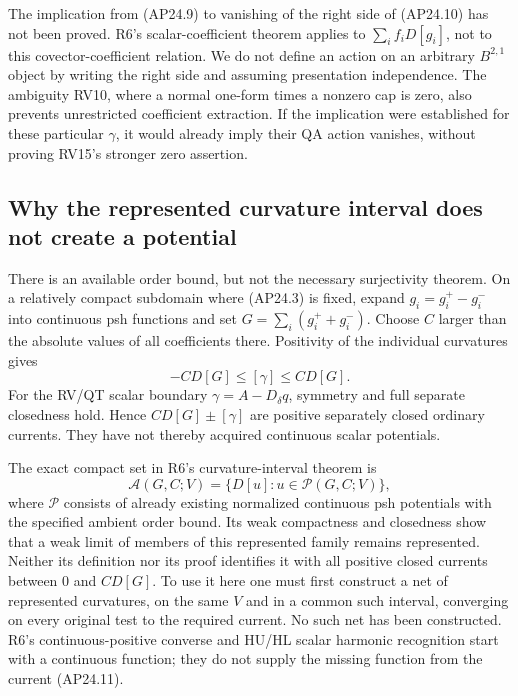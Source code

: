 The implication from (AP24.9) to vanishing of the right side of
(AP24.10) has not been proved.  R6's scalar-coefficient theorem
applies to \(\sum_i f_iD[g_i]\), not to this covector-coefficient
relation.  We do not define an action on an arbitrary
\(B^{2,1}\) object by writing the right side and assuming
presentation independence.  The ambiguity RV10, where a normal
one-form times a nonzero cap is zero, also prevents unrestricted
coefficient extraction.  If the implication were established for
these particular \(\gamma\), it would already imply their QA
action vanishes, without proving RV15's stronger zero assertion.

\subsection{Why the represented curvature interval does not create a potential}

There is an available order bound, but not the necessary
surjectivity theorem.  On a relatively compact subdomain where
(AP24.3) is fixed, expand \(g_i=g_i^+-g_i^-\) into continuous
psh functions and set \(G=\sum_i(g_i^++g_i^-)\).
Choose \(C\) larger than the absolute values of all coefficients
there.  Positivity of the individual curvatures gives
\[
                       -C D[G]\le[\gamma]\le C D[G].      \tag{AP24.11}
\]
For the RV/QT scalar boundary \(\gamma=A-D_\delta q\), symmetry
and full separate closedness hold.  Hence
\(CD[G]\pm[\gamma]\) are positive separately closed ordinary
currents.  They have not thereby acquired continuous scalar
potentials.

The exact compact set in R6's curvature-interval theorem is
\[
 \mathscr A(G,C;V)
  =\{D[u]:u\in\mathscr P(G,C;V)\},                         \tag{AP24.12}
\]
where \(\mathscr P\) consists of already existing normalized
continuous psh potentials with the specified ambient order bound.
Its weak compactness and closedness show that a weak limit of
members of this represented family remains represented.  Neither
its definition nor its proof identifies it with all positive
closed currents between \(0\) and \(CD[G]\).
To use it here one must first construct a net of represented
curvatures, on the same \(V\) and in a common such interval,
converging on every original test to the required current.
No such net has been constructed.  R6's continuous-positive
converse and HU/HL scalar harmonic recognition start with a
continuous function; they do not supply the missing function
from the current (AP24.11).

